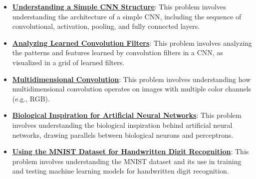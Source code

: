 \documentclass{article}%
\begin{document}
\begin{itemize}[leftmargin=*]
\item \href{https://purdue.brightspace.com/d2l/common/assets/pdfjs-d2l-dist/1.0.14-legacy/web/viewer.html?file=\%2Fcontent\%2Fenforced\%2F1095467-wl.202510.CS.24300.001\%2F09L1-cnn.pdf\%3Fou\%3D1095467\&lang=en-us\&container=d2l-fileviewer-rendered-pdf\&fullscreen=d2l-fileviewer-rendered-pdf-dialog\&height=667#page=17}{\textbf{Understanding a Simple CNN Structure}}: This problem involves understanding the architecture of a simple CNN, including the sequence of convolutional, activation, pooling, and fully connected layers.%
\item \href{https://purdue.brightspace.com/d2l/common/assets/pdfjs-d2l-dist/1.0.14-legacy/web/viewer.html?file=\%2Fcontent\%2Fenforced\%2F1095467-wl.202510.CS.24300.001\%2F09L1-cnn.pdf\%3Fou\%3D1095467\&lang=en-us\&container=d2l-fileviewer-rendered-pdf\&fullscreen=d2l-fileviewer-rendered-pdf-dialog\&height=667#page=18}{\textbf{Analyzing Learned Convolution Filters}}: This problem involves analyzing the patterns and features learned by convolution filters in a CNN, as visualized in a grid of learned filters.%
\item \href{https://purdue.brightspace.com/d2l/common/assets/pdfjs-d2l-dist/1.0.14-legacy/web/viewer.html?file=\%2Fcontent\%2Fenforced\%2F1095467-wl.202510.CS.24300.001\%2F09L1-cnn.pdf\%3Fou\%3D1095467\&lang=en-us\&container=d2l-fileviewer-rendered-pdf\&fullscreen=d2l-fileviewer-rendered-pdf-dialog\&height=667#page=19}{\textbf{Multidimensional Convolution}}: This problem involves understanding how multidimensional convolution operates on images with multiple color channels (e.g., RGB).%
\item \href{https://purdue.brightspace.com/d2l/common/assets/pdfjs-d2l-dist/1.0.14-legacy/web/viewer.html?file=\%2Fcontent\%2Fenforced\%2F1095467-wl.202510.CS.24300.001\%2F09L1-cnn.pdf\%3Fou\%3D1095467\&lang=en-us\&container=d2l-fileviewer-rendered-pdf\&fullscreen=d2l-fileviewer-rendered-pdf-dialog\&height=667#page=20}{\textbf{Biological Inspiration for Artificial Neural Networks}}: This problem involves understanding the biological inspiration behind artificial neural networks, drawing parallels between biological neurons and perceptrons.%
\item \href{https://purdue.brightspace.com/d2l/common/assets/pdfjs-d2l-dist/1.0.14-legacy/web/viewer.html?file=\%2Fcontent\%2Fenforced\%2F1095467-wl.202510.CS.24300.001\%2F09L1-cnn.pdf\%3Fou\%3D1095467\&lang=en-us\&container=d2l-fileviewer-rendered-pdf\&fullscreen=d2l-fileviewer-rendered-pdf-dialog\&height=667#page=21}{\textbf{Using the MNIST Dataset for Handwritten Digit Recognition}}: This problem involves understanding the MNIST dataset and its use in training and testing machine learning models for handwritten digit recognition.%

\end{itemize}
\end{document}
